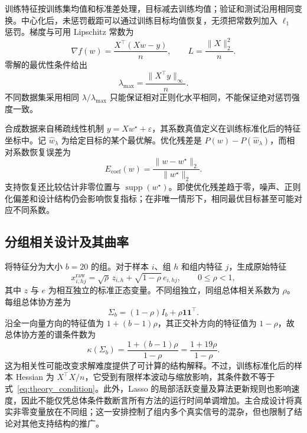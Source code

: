 训练特征按训练集均值和标准差处理，目标减去训练均值；验证和测试沿用相同变换。中心化后，未惩罚截距可以通过训练目标均值恢复，无须把常数列加入 $\ell_1$ 惩罚。梯度与可用 Lipschitz 常数为
\begin{equation}
  \nabla f(w)=\frac{X^\top(Xw-y)}{n},\qquad
  L=\frac{\|X\|_2^2}{n}.
  \label{eq:theory_gradient}
\end{equation}
零解的最优性条件给出
\begin{equation}
  \lambda_{\max}=\frac{\|X^\top y\|_\infty}{n}.
  \label{eq:theory_lambdamax}
\end{equation}
不同数据集采用相同 $\lambda/\lambda_{\max}$ 只能保证相对正则化水平相同，不能保证绝对惩罚强度一致。

合成数据来自稀疏线性机制 $y=Xw^\star+\varepsilon$，其系数真值定义在训练标准化后的特征坐标中。记 $\widehat w_\lambda$ 为给定目标的某个最优解。优化残差是 $P(w)-P(\widehat w_\lambda)$，而相对系数恢复误差为
\begin{equation}
  E_{\mathrm{coef}}(w)=\frac{\|w-w^\star\|_2}{\|w^\star\|_2}.
  \label{eq:theory_recovery}
\end{equation}
支持恢复还比较估计非零位置与 $\operatorname{supp}(w^\star)$。即使优化残差趋于零，噪声、正则化偏差和设计结构仍会影响恢复指标；在非唯一情形下，相同最优目标甚至可能对应不同系数。

\subsection{分组相关设计及其曲率}
将特征分为大小 $b=20$ 的组。对于样本 $i$、组 $h$ 和组内特征 $j$，生成原始特征
\begin{equation}
  x^{\mathrm{raw}}_{i,hj}
    =\sqrt{\rho}\,z_{i,h}+\sqrt{1-\rho}\,e_{i,hj},
  \qquad 0\leq\rho<1,
  \label{eq:theory_generation}
\end{equation}
其中 $z$ 与 $e$ 为相互独立的标准正态变量。不同组独立，同组总体相关系数为 $\rho$。每组总体协方差为
\begin{equation}
  \Sigma_b=(1-\rho)I_b+\rho\mathbf{1}\mathbf{1}^\top.
  \label{eq:theory_covariance}
\end{equation}
沿全一向量方向的特征值为 $1+(b-1)\rho$，其正交补方向的特征值为 $1-\rho$，故总体协方差的谱条件数为
\begin{equation}
  \kappa(\Sigma_b)
    =\frac{1+(b-1)\rho}{1-\rho}
    =\frac{1+19\rho}{1-\rho}.
  \label{eq:theory_condition}
\end{equation}
这为相关性可能改变求解难度提供了可计算的结构解释。不过，训练标准化后的样本 Hessian 为 $X^\top X/n$，它受到有限样本波动与缩放影响，其条件数不等于式~\eqref{eq:theory_condition}。此外，Lasso 的局部活跃变量及算法更新规则也影响速度，因此不能仅凭总体条件数断言所有方法的运行时间单调增加。主合成设计将真实非零变量放在不同组；这一安排控制了组内多个真实信号的混杂，但也限制了结论对其他支持结构的推广。

